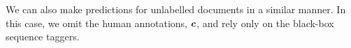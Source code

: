 We can also make predictions for unlabelled documents in a similar manner. In this case, we omit the 
human annotations, $\boldsymbol c$, and rely only on the black-box sequence taggers.

%
